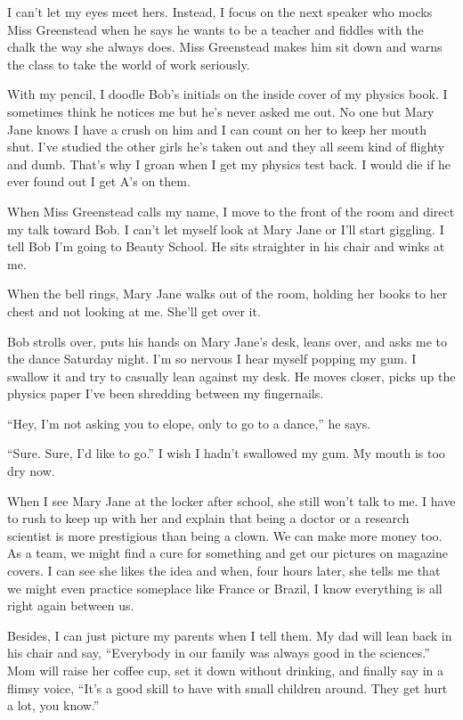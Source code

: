 \documentclass[
]{article}
\begin{document}
I can't let my eyes meet hers. Instead, I focus on the next speaker who
mocks Miss Greenstead when he says he wants to be a teacher and fiddles
with the chalk the way she always does. Miss Green­stead makes him sit
down and warns the class to take the world of work seriously.

With my pencil, I doodle Bob's initials on the inside cover of my
physics book. I sometimes think he notices me but he's never asked me
out. No one but Mary Jane knows I have a crush on him and I can count on
her to keep her mouth shut. I've studied the other girls he's taken out
and they all seem kind of flighty and dumb. That's why I groan when I
get my physics test back. I would die if he ever found out I get A's on
them.

When Miss Greenstead calls my name, I move to the front of the room and
direct my talk toward Bob. I can't let myself look at Mary Jane or I'll
start giggling. I tell Bob I'm going to Beauty School. He sits
straighter in his chair and winks at me.

When the bell rings, Mary Jane walks out of the room, holding her books
to her chest and not looking at me. She'll get over it.

Bob strolls over, puts his hands on Mary Jane's desk, leans over, and
asks me to the dance Saturday night. I'm so nervous I hear myself
popping my gum. I swallow it and try to casually lean against my desk.
He moves closer, picks up the physics paper I've been shredding between
my fingernails.

``Hey, I'm not asking you to elope, only to go to a dance,'' he says.

``Sure. Sure, I'd like to go.'' I wish I hadn't swallowed my gum. My
mouth is too dry now.

When I see Mary Jane at the locker after school, she still won't talk to
me. I have to rush to keep up with her and explain that being a doctor
or a research scientist is more prestigious than being a clown. We can
make more money too. As a team, we might find a cure for something and
get our pictures on magazine covers. I can see she likes the idea and
when, four hours later, she tells me that we might even practice
someplace like France or Brazil, I know everything is all right again
between us.

Besides, I can just picture my parents when I tell them. My dad will
lean back in his chair and say, ``Everybody in our family was always
good in the sciences.'' Mom will raise her coffee cup, set it down
without drinking, and finally say in a flimsy voice, ``It's a good skill
to have with small children around. They get hurt a lot, you know.''
\end{document}
